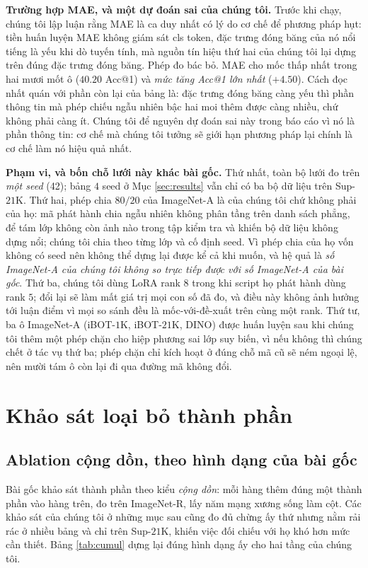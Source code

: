 \documentclass[11pt,a4paper]{article}
\begin{document}
\textbf{Trường hợp MAE, và một dự đoán sai của chúng tôi.} Trước khi chạy,
chúng tôi lập luận rằng MAE là ca duy nhất có lý do cơ chế để phương pháp hụt:
tiền huấn luyện MAE không giám sát cls token, đặc trưng đóng băng của nó nổi
tiếng là yếu khi dò tuyến tính, mà nguồn tín hiệu thứ hai của chúng tôi lại
dựng trên đúng đặc trưng đóng băng. Phép đo bác bỏ. MAE cho mốc thấp nhất
trong hai mươi mốt ô ($40.20$ Acc@1) và \emph{mức tăng Acc@1 lớn nhất}
($+4.50$). Cách đọc nhất quán với phần còn lại của bảng là: đặc trưng đóng
băng càng yếu thì phần thông tin mà phép chiếu ngẫu nhiên bậc hai moi thêm
được càng nhiều, chứ không phải càng ít. Chúng tôi để nguyên dự đoán sai này
trong báo cáo vì nó là phần thông tin: cơ chế mà chúng tôi tưởng sẽ giới hạn
phương pháp lại chính là cơ chế làm nó hiệu quả nhất.

\textbf{Phạm vi, và bốn chỗ lưới này khác bài gốc.} Thứ nhất, toàn bộ lưới đo
trên \emph{một seed} (42); bảng $4$ seed ở Mục \ref{sec:results} vẫn chỉ có ba
bộ dữ liệu trên Sup-$21$K. Thứ hai, phép chia $80/20$ của ImageNet-A là của
chúng tôi chứ không phải của họ: mã phát hành chia ngẫu nhiên không phân tầng
trên danh sách phẳng, để tám lớp không còn ảnh nào trong tập kiểm tra và khiến
bộ dữ liệu không dựng nổi; chúng tôi chia theo từng lớp và cố định seed. Vì
phép chia của họ vốn không có seed nên không thể dựng lại được kể cả khi muốn,
và hệ quả là \emph{số ImageNet-A của chúng tôi không so trực tiếp được với số
ImageNet-A của bài gốc}. Thứ ba, chúng tôi dùng LoRA rank $8$ trong khi script
họ phát hành dùng rank $5$; đổi lại sẽ làm mất giá trị mọi con số đã đo, và
điều này không ảnh hưởng tới luận điểm vì mọi so sánh đều là mốc-với-đề-xuất
trên cùng một rank. Thứ tư, ba ô ImageNet-A (iBOT-$1$K, iBOT-$21$K, DINO) được
huấn luyện sau khi chúng tôi thêm một phép chặn cho hiệp phương sai lớp suy
biến, vì nếu không thì chúng chết ở tác vụ thứ ba; phép chặn chỉ kích hoạt ở
đúng chỗ mã cũ sẽ ném ngoại lệ, nên mười tám ô còn lại đi qua đường mã không
đổi.

\section{Khảo sát loại bỏ thành phần}

\subsection{Ablation cộng dồn, theo hình dạng của bài gốc}
\label{sec:cumulative}

Bài gốc khảo sát thành phần theo kiểu \emph{cộng dồn}: mỗi hàng thêm đúng một
thành phần vào hàng trên, đo trên ImageNet-R, lấy năm mạng xương sống làm cột.
Các khảo sát của chúng tôi ở những mục sau cũng đo đủ chừng ấy thứ nhưng nằm
rải rác ở nhiều bảng và chỉ trên Sup-$21$K, khiến việc đối chiếu với họ khó hơn
mức cần thiết. Bảng \ref{tab:cumul} dựng lại đúng hình dạng ấy cho hai tầng của
chúng tôi.
\end{document}
